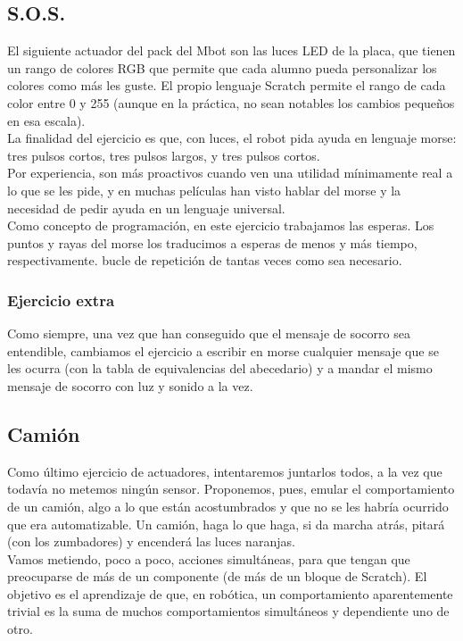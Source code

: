 \subsection{S.O.S.}
El siguiente actuador del pack del Mbot son las luces LED de la placa, que tienen un rango de colores RGB que permite que cada alumno pueda personalizar los colores como más les guste. El propio lenguaje Scratch permite el rango de cada color entre 0 y 255 (aunque en la práctica, no sean notables los cambios pequeños en esa escala).\\
La finalidad del ejercicio es que, con luces, el robot pida ayuda en lenguaje morse: tres pulsos cortos, tres pulsos largos, y tres pulsos cortos. \\
Por experiencia, son más proactivos cuando ven una utilidad mínimamente real a lo que se les pide, y en muchas películas han visto hablar del morse y la necesidad de pedir ayuda en un lenguaje universal. \\
Como concepto de programación, en este ejercicio trabajamos las esperas. Los puntos y rayas del morse los traducimos a esperas de menos y más tiempo, respectivamente.
bucle de repetición de tantas veces como sea necesario.\\
\subsubsection{Ejercicio extra}
Como siempre, una vez que han conseguido que el mensaje de socorro sea entendible, cambiamos el ejercicio a escribir en morse cualquier mensaje que se les ocurra (con la tabla de equivalencias del abecedario) y a mandar el mismo mensaje de socorro con luz y sonido a la vez.

\subsection{Camión}
Como último ejercicio de actuadores, intentaremos juntarlos todos, a la vez que todavía no metemos ningún sensor. Proponemos, pues, emular el comportamiento de un camión, algo a lo que están acostumbrados y que no se les habría ocurrido que era automatizable. Un camión, haga lo que haga, si da marcha atrás, pitará (con los zumbadores) y encenderá las luces naranjas. \\
Vamos metiendo, poco a poco, acciones simultáneas, para que tengan que preocuparse de más de un componente (de más de un bloque de Scratch). El objetivo es el aprendizaje de que, en robótica, un comportamiento aparentemente trivial es la suma de muchos comportamientos simultáneos y dependiente uno de otro.